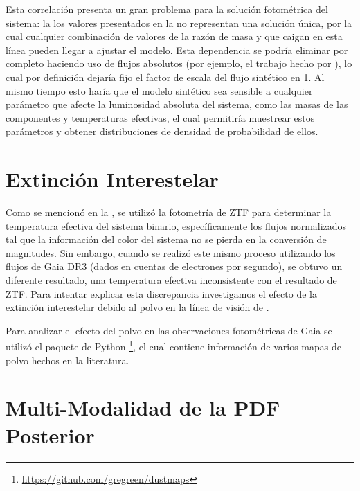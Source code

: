 Esta correlación presenta un gran problema para la solución fotométrica del
sistema: la los valores presentados en la
 no
representan una solución única, por la cual cualquier combinación de valores de
la razón de masa y  que caigan en esta línea pueden llegar a
ajustar el modelo. Esta dependencia se podría eliminar por completo haciendo uso
de flujos absolutos (por ejemplo, el trabajo hecho por
),
lo cual por definición dejaría fijo el factor de escala del flujo sintético en
1. Al mismo tiempo esto haría que el modelo sintético sea sensible a cualquier
parámetro que afecte la luminosidad absoluta del sistema, como las masas de las
componentes y temperaturas efectivas, el cual permitiría muestrear estos
parámetros y obtener distribuciones de densidad de probabilidad de ellos.


\section{Extinción Interestelar}

Como se mencionó en la
, se
utilizó la fotometría de ZTF para determinar la temperatura efectiva del sistema
binario, específicamente los flujos normalizados tal que la información del
color del sistema no se pierda en la conversión de magnitudes. Sin embargo,
cuando se realizó este mismo proceso utilizando los flujos de Gaia DR3 (dados en
cuentas de electrones por segundo), se obtuvo un diferente resultado, una
temperatura efectiva inconsistente con el resultado de ZTF. Para intentar
explicar esta discrepancia investigamos el efecto de la extinción interestelar
debido al polvo en la línea de visión de \atoObjIdNoSpace.

Para analizar el efecto del polvo en las observaciones fotométricas de Gaia se utilizó el paquete de Python \footnote{\url{https://github.com/gregreen/dustmaps}}, el cual contiene información de varios mapas de polvo hechos en la literatura. 

\section{Multi-Modalidad de la PDF Posterior}

